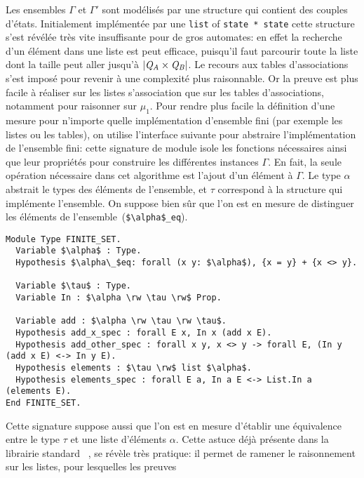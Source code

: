 Les ensembles $\Gamma$ et $\Gamma'$ sont modélisés par une structure
qui contient des couples d'états. Initialement implémentée par une \lstinline!list! of \lstinline!state * state!
cette structure s'est révélée très vite insuffisante pour de gros automates: en effet la recherche d'un élément
dans une liste est peut efficace, puisqu'il faut parcourir toute la liste dont la taille peut aller jusqu'à $|\mathit Q_\mathit A \times \mathit Q_\mathit B|$.
Le recours aux tables d'associations s'est imposé pour revenir à une complexité plus raisonnable.
Or la preuve est plus facile à réaliser sur les listes s'association que sur les tables d'associations,
notamment pour raisonner sur $\mu_1$.
Pour rendre plus facile la définition d'une mesure pour n'importe quelle implémentation d'ensemble fini
(par exemple les listes ou les tables), on utilise l'interface suivante pour abstraire l'implémentation 
de l'ensemble fini: cette signature de module isole les fonctions nécessaires ainsi que leur propriétés pour construire
les différentes instances $\Gamma$. En fait, la seule opération nécessaire dans cet algorithme est l'ajout d'un élément à $\Gamma$.
Le type $\alpha$ abstrait le types des éléments de l'ensemble, et $\tau$ correspond à la structure qui implémente l'ensemble.
On suppose bien sûr que l'on est en mesure de distinguer les éléments de l'ensemble~(\lstinline!$\alpha$_eq!).
\begin{lstlisting}
Module Type FINITE_SET.
  Variable $\alpha$ : Type.
  Hypothesis $\alpha\_$eq: forall (x y: $\alpha$), {x = y} + {x <> y}.
  
  Variable $\tau$ : Type.
  Variable In : $\alpha \rw \tau \rw$ Prop.
  
  Variable add : $\alpha \rw \tau \rw \tau$.
  Hypothesis add_x_spec : forall E x, In x (add x E).
  Hypothesis add_other_spec : forall x y, x <> y -> forall E, (In y (add x E) <-> In y E).
  Hypothesis elements : $\tau \rw$ list $\alpha$.
  Hypothesis elements_spec : forall E a, In a E <-> List.In a (elements E).
End FINITE_SET.
\end{lstlisting}
Cette signature suppose aussi que l'on est en mesure d'établir une équivalence entre le type $\tau$ et une
liste d'éléments $\alpha$. Cette astuce déjà présente dans la librairie standard \coq~\cite{coq-stdlib}, 
se révèle très pratique: il permet de ramener le raisonnement sur les listes, pour lesquelles les preuves
